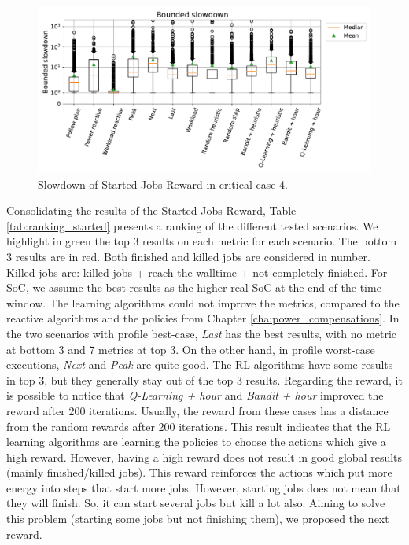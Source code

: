 \begin{figure}[!htb]
    \centering
    \includegraphics[scale=0.5]{Images/Learning_compensations/slowdown.pdf}
    \caption{Slowdown of Started Jobs Reward in critical case 4.}
    \label{fig:slowdown_results_critical_4}
\end{figure}

Consolidating the results of the Started Jobs Reward, Table \ref{tab:ranking_started} presents a ranking of the different tested scenarios. We highlight in green the top 3 results on each metric for each scenario. The bottom 3 results are in red. Both finished and killed jobs are considered in number. Killed jobs are: killed jobs + reach the walltime + not completely finished. For SoC, we assume the best results as the higher real SoC at the end of the time window. The learning algorithms could not improve the metrics, compared to the reactive algorithms and the policies from Chapter \ref{cha:power_compensations}. In the two scenarios with profile best-case, \emph{Last} has the best results, with no metric at bottom 3 and 7 metrics at top 3. On the other hand, in profile worst-case executions, \emph{Next} and \emph{Peak} are quite good. The RL algorithms have some results in top 3, but they generally stay out of the top 3 results. Regarding the reward, it is possible to notice that \emph{Q-Learning + hour} and \emph{Bandit + hour} improved the reward after 200 iterations. Usually, the reward from these cases has a distance from the random rewards after 200 iterations. This result indicates that the RL learning algorithms are learning the policies to choose the actions which give a high reward. However, having a high reward does not result in good global results (mainly finished/killed jobs). This reward reinforces the actions which put more energy into steps that start more jobs. However, starting jobs does not mean that they will finish. So, it can start several jobs but kill a lot also. Aiming to solve this problem (starting some jobs but not finishing them), we proposed the next reward.

